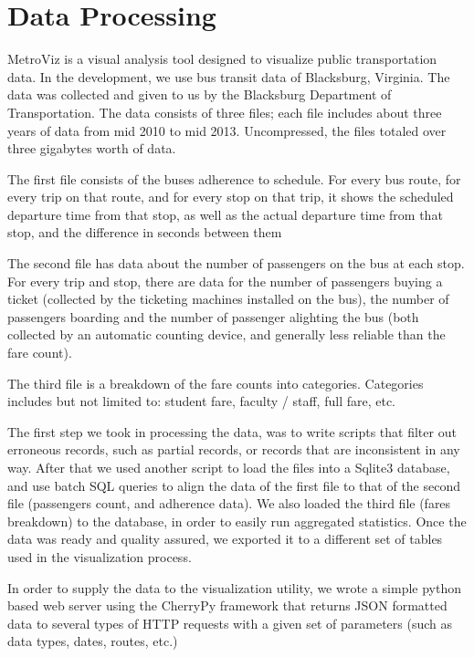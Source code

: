 \documentclass[journal]{vgtc}                %
\begin{document}
\section{Data Processing}

MetroViz is a visual analysis tool designed to visualize public transportation data. In the development, we use bus transit data of Blacksburg, Virginia. The data was collected and given to us by the Blacksburg Department of Transportation. The data consists of three files; each file includes about three years of data from mid 2010 to mid 2013. Uncompressed, the files totaled over three gigabytes worth of data.

The first file consists of the buses adherence to schedule. For every bus route, for every trip on that route, and for every stop on that trip, it shows the scheduled departure time from that stop, as well as the actual departure time from that stop, and the difference in seconds between them

The second file has data about the number of passengers on the bus at each stop. For every trip and stop, there are data for the number of passengers buying a ticket (collected by the ticketing machines installed on the bus), the number of passengers boarding and the number of passenger alighting the bus (both collected by an automatic counting device, and generally less reliable than the fare count).

The third file is a breakdown of the fare counts into categories. Categories includes but not limited to: student fare, faculty / staff, full fare, etc.

The first step we took in processing the data, was to write scripts that filter out erroneous records, such as partial records, or records that are inconsistent in any way. After that we used another script to load the files into a Sqlite3 database, and use batch SQL queries to align the data of the first file to that of the second file (passengers count, and adherence data). We also loaded the third file (fares breakdown) to the database, in order to easily run aggregated statistics. Once the data was ready and quality assured, we exported it to a different set of tables used in the visualization process.

In order to supply the data to the visualization utility, we wrote a simple python based web server using the CherryPy framework that returns JSON formatted data to several types of HTTP requests with a given set of parameters (such as data types, dates, routes, etc.)
\end{document}
